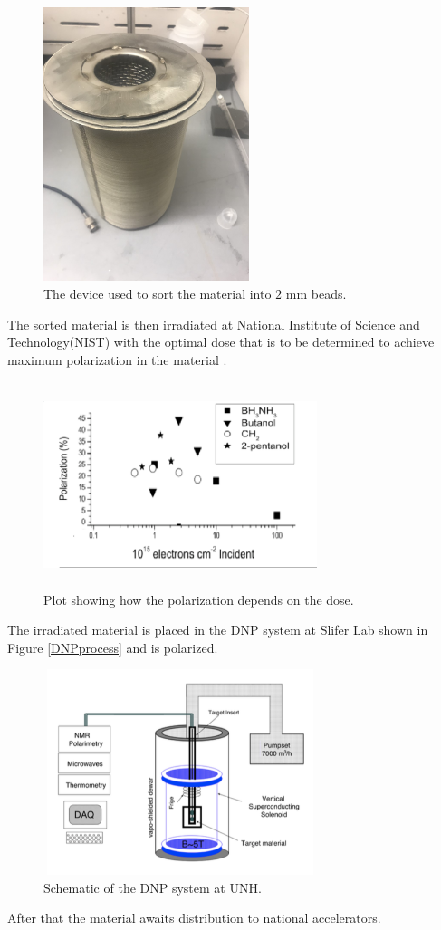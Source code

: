 \documentclass[12pt,notitlepage]{amsart}
\begin{document}
 \begin{figure}[ht]
\caption{The device used to sort the material into $2$ mm beads.}
\label{Crusher}
\centering
\includegraphics[width = 6cm,height = 8cm]{Crusher} 
\end{figure}


The sorted material is then irradiated at National Institute of Science and Technology(NIST) with the optimal dose that is to be determined to achieve maximum polarization in the material \cite{jay}.
 \begin{figure}[ht]
\caption{Plot showing how the polarization depends on the dose.}
\label{DNP}
\centering
\includegraphics[width = 8cm,height = 6cm]{DoctoredData} 
\end{figure}

The irradiated material is placed in the DNP system at Slifer Lab shown in Figure \ref{DNPprocess} and is polarized. 

   \begin{figure}[ht]
\caption{Schematic of the DNP system at UNH.}
\label{DNP}
\centering
\includegraphics[width = 8cm,height = 6cm]{DNP_sys} 
\end{figure}
After that the material awaits distribution to national accelerators. 
 
\end{document}
